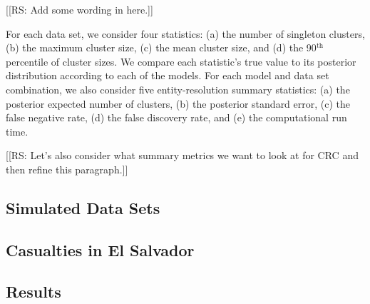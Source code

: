 \documentclass[11pt]{article}\usepackage[]{graphicx}\usepackage[]{color}
\begin{document}
[[RS: Add some wording in here.]]

For each data set, we consider four statistics: (a) the number of singleton clusters, (b) the maximum cluster size, (c) the mean cluster size, and (d) the 90$^{\textrm{th}}$ percentile of cluster sizes. We compare each statistic's true value to its posterior distribution according to each of the models. For each model and data set combination, we also consider five entity-resolution summary statistics: (a) the posterior expected number of clusters, (b) the posterior standard error, (c) the false negative rate, (d) the false discovery rate, and (e) the computational run time.

[[RS: Let's also consider what summary metrics we want to look at for CRC and then refine this paragraph.]]


\subsection{Simulated Data Sets}
\label{sec:simdata}

\subsection{Casualties in El Salvador}
\label{sec:elsalvador}

%
%
%
%

\subsection{Results}
\label{sec:results}
\end{document}
